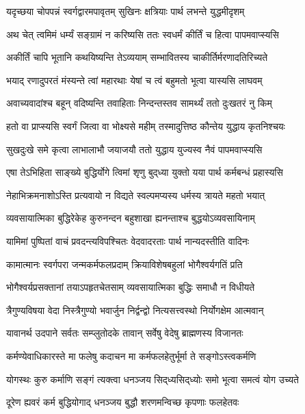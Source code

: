 \twolineshloka
{यदृच्छया चोपपन्नं स्वर्गद्वारमपावृतम्}
{सुखिनः क्षत्रियाः पार्थ लभन्ते युद्धमीदृशम्}%

\twolineshloka
{अथ चेत् त्वमिमं धर्म्यं सङ्ग्रामं न करिष्यसि}
{ततः स्वधर्मं कीर्तिं च हित्वा पापमवाप्स्यसि}%

\twolineshloka
{अकीर्तिं चापि भूतानि कथयिष्यन्ति तेऽव्ययाम्}
{सम्भावितस्य चाकीर्तिर्मरणादतिरिच्यते}%

\twolineshloka
{भयाद् रणादुपरतं मंस्यन्ते त्वां महारथाः}
{येषां च त्वं बहुमतो भूत्वा यास्यसि लाघवम्}%

\twolineshloka
{अवाच्यवादांश्च बहून् वदिष्यन्ति तवाहिताः}
{निन्दन्तस्तव सामर्थ्यं ततो दुःखतरं नु किम्}%

\twolineshloka
{हतो वा प्राप्स्यसि स्वर्गं जित्वा वा भोक्ष्यसे महीम्}
{तस्मादुत्तिष्ठ कौन्तेय युद्धाय कृतनिश्चयः}%

\twolineshloka
{सुखदुःखे समे कृत्वा लाभालाभौ जयाजयौ}
{ततो युद्धाय युज्यस्व नैवं पापमवाप्स्यसि}%

\twolineshloka
{एषा तेऽभिहिता साङ्ख्ये बुद्धिर्योगे त्विमां शृणु}
{बुद्‍ध्या युक्तो यया पार्थ कर्मबन्धं प्रहास्यसि}%

\twolineshloka
{नेहाभिक्रमनाशोऽस्ति प्रत्यवायो न विद्यते}
{स्वल्पमप्यस्य धर्मस्य त्रायते महतो भयात्}%

\twolineshloka
{व्यवसायात्मिका बुद्धिरेकेह कुरुनन्दन}
{बहुशाखा ह्यनन्ताश्च बुद्धयोऽव्यवसायिनाम्}%

\twolineshloka
{यामिमां पुष्पितां वाचं प्रवदन्त्यविपश्चितः}
{वेदवादरताः पार्थ नान्यदस्तीति वादिनः}%

\twolineshloka
{कामात्मानः स्वर्गपरा जन्मकर्मफलप्रदाम्}
{क्रियाविशेषबहुलां भोगैश्वर्यगतिं प्रति}%

\twolineshloka
{भोगैश्वर्यप्रसक्तानां तयाऽपहृतचेतसाम्}
{व्यवसायात्मिका बुद्धिः समाधौ न विधीयते}%

\twolineshloka
{त्रैगुण्यविषया वेदा निस्त्रैगुण्यो भवार्जुन}
{निर्द्वन्द्वो नित्यसत्त्वस्थो निर्योगक्षेम आत्मवान्}%

\twolineshloka
{यावानर्थ उदपाने सर्वतः सम्प्लुतोदके}
{तावान् सर्वेषु वेदेषु ब्राह्मणस्य विजानतः}%

\twolineshloka
{कर्मण्येवाधिकारस्ते मा फलेषु कदाचन}
{मा कर्मफलहेतुर्भूर्मा ते सङ्गोऽस्त्वकर्मणि}%

\twolineshloka
{योगस्थः कुरु कर्माणि सङ्गं त्यक्त्वा धनञ्जय}
{सिद्‌ध्यसिद्‌ध्योः समो भूत्वा समत्वं योग उच्यते}%

\twolineshloka
{दूरेण ह्यवरं कर्म बुद्धियोगाद् धनञ्जय}
{बुद्धौ शरणमन्विच्छ कृपणाः फलहेतवः}%

